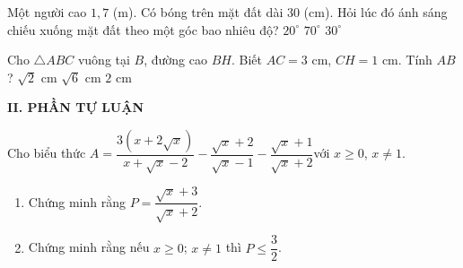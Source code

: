 \begin{ex}%
Một người cao $1,7$ (m). Có bóng trên mặt đất dài $30$ (cm). Hỏi lúc đó ánh sáng chiếu xuống mặt đất theo một góc bao nhiêu độ?
{$20^{\circ}$}
{$70^{\circ}$}
{$30^{\circ}$}
\end{ex}

\begin{ex}%
Cho $\triangle ABC$ vuông tại $B$, đường cao $BH$. Biết $AC=3$ cm, $CH=1$ cm. Tính $AB$?
{$\sqrt{2}$ cm}
{\True $\sqrt{6}$ cm}
{$2$ cm}
\end{ex}

\noindent\textbf{II. PHẦN TỰ LUẬN}
\setcounter{ex}{0}
\begin{ex}%
Cho biểu thức $A=\dfrac{3(x+2\sqrt{x})}{x+\sqrt{x}-2}-\dfrac{\sqrt{x}+2}{\sqrt{x}-1}-\dfrac{\sqrt{x}+1}{\sqrt{x}+2}$\quad với $x\ge 0$, $x\neq 1$. 
\begin{enumerate}
\item Chứng minh rằng $P=\dfrac{\sqrt{x}+3}{\sqrt{x}+2}$.
\item Chứng minh rằng nếu $x\geq 0$; $x\neq 1$ thì $P\leq \dfrac{3}{2}$.
\end{enumerate}
\end{ex}

